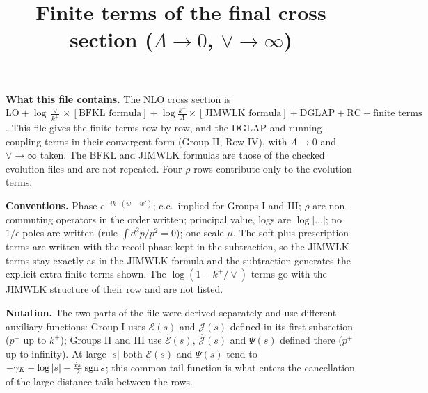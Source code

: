 \documentclass[9pt]{article}
\title{Finite terms of the final cross section ($\Lambda\to0$, $\vee\to\infty$)}
\author{}
\date{}
\numberwithin{equation}{section}
\begin{document}
\maketitle
\noindent\textbf{What this file contains.} The NLO cross section is
$\mathrm{LO}+\log\frac{\vee}{k^{+}}\times[\text{BFKL formula}]+\log\frac{k^{+}}{\Lambda}\times[\text{JIMWLK formula}]+\text{DGLAP}+\text{RC}+\text{finite terms}$.
This file gives the finite terms row by row, and the DGLAP and running-coupling terms in their convergent form (Group II, Row IV), with $\Lambda\to0$ and $\vee\to\infty$ taken. The BFKL and JIMWLK formulas are those of the checked evolution files and are not repeated. Four-$\rho$ rows contribute only to the evolution terms.

\noindent\textbf{Conventions.} Phase $e^{-ik\cdot(w-w')}$; c.c.\ implied for Groups I and III; $\rho$ are non-commuting operators in the order written; principal value, logs are $\log|\dots|$; no $1/\epsilon$ poles are written (rule $\int d^{2}p/p^{2}=0$); one scale $\mu$. The soft plus-prescription terms are written with the recoil phase kept in the subtraction, so the JIMWLK terms stay exactly as in the JIMWLK formula and the subtraction generates the explicit extra finite terms shown. The $\log(1-k^{+}/\vee)$ terms go with the JIMWLK structure of their row and are not listed.

\noindent\textbf{Notation.} The two parts of the file were derived separately and use different auxiliary functions: Group I uses $\mathcal{E}(s)$ and $\mathcal{J}(s)$ defined in its first subsection ($p^{+}$ up to $k^{+}$); Groups II and III use $\widehat{\mathcal{E}}(s)$, $\widehat{\mathcal{J}}(s)$ and $\Psi(s)$ defined there ($p^{+}$ up to infinity). At large $|s|$ both $\mathcal{E}(s)$ and $\Psi(s)$ tend to $-\gamma_{E}-\log|s|-\frac{i\pi}{2}\,{\rm sgn}\,s$; this common tail function is what enters the cancellation of the large-distance tails between the rows.

\end{document}
